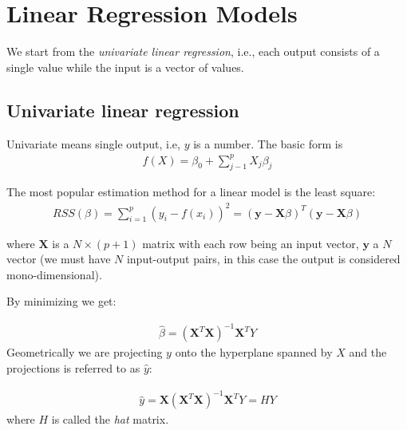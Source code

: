 \documentclass[12pt, letterpaper]{article}
\theoremstyle{definition}
\newcommand{\X}{\mathrm{\mathbf{X}}}
\begin{document}
\newpage
\section{Linear Regression Models}
We start from the \textit{univariate linear regression}, i.e., each output consists of a single value while the input is a vector of values.

\subsection{Univariate linear regression}
Univariate means single output, i.e, $y$ is a number. The basic form is 
\begin{align}
f(X) = \beta_0 + \sum_{j-1}^p X_j \beta_j
\end{align}

The most popular estimation method for a linear model is the least square:
\begin{align}
RSS(\beta) = \sum_{i=1}^{p}  \left( y_i - f(x_i) \right)^2 = \left(\bm{y} - \bm{X}\beta\right)^T \left(\bm{y} - \bm{X}\beta\right)
\end{align}

where $\bm{X}$ is a $N \times (p+1)$ matrix with each row being an input vector, $\bm{y}$ a $N$ vector (we must have $N$ input-output pairs, in this case the output is considered mono-dimensional).

By minimizing we get:

\begin{align}
\hat{\beta} = \left( \X^T \X\right)^{-1} \X^TY
\label{OLSRegression}
\end{align}
Geometrically we are projecting $y$ onto the hyperplane spanned by $X$ and the projections is referred to as $\hat{y}$:

\begin{align}
\hat{y} =\X \left( \X^T \X\right)^{-1} \X^T Y = H Y
\end{align}
where $H$ is called the \textit{hat} matrix.


\end{document}
